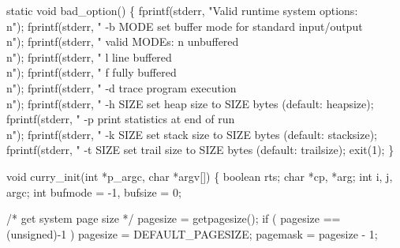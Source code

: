 static void
bad_option()
\{
    fprintf(stderr, "Valid runtime system options:\\n");
    fprintf(stderr, " -b MODE  set buffer mode for standard input/output\\n");
    fprintf(stderr, "          valid MODEs: n  unbuffered\\n");
    fprintf(stderr, "                       l  line buffered\\n");
    fprintf(stderr, "                       f  fully buffered\\n");
    fprintf(stderr, " -d       trace program execution\\n");
    fprintf(stderr, " -h SIZE  set heap size to SIZE bytes (default: %
            heapsize);
    fprintf(stderr, " -p       print statistics at end of run\\n");
    fprintf(stderr, " -k SIZE  set stack size to SIZE bytes (default: %
            stacksize);
    fprintf(stderr, " -t SIZE  set trail size to SIZE bytes (default: %
            trailsize);
    exit(1);
\}

void
curry_init(int *p_argc, char *argv[])
\{
    boolean rts;
    char    *cp, *arg;
    int     i, j, argc;
    int     bufmode = -1, bufsize = 0;

    /* get system page size */
    pagesize = getpagesize();
    if ( pagesize == (unsigned)-1 )
        pagesize = DEFAULT_PAGESIZE;
    pagemask = pagesize - 1;

